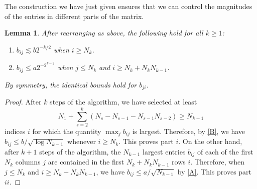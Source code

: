 \documentclass[10pt,reqno]{amsart}
\newtheorem{lem}[thm]{Lemma}
\theoremstyle{definition}
\numberwithin{equation}{section}
\numberwithin{figure}{section}
\numberwithin{table}{section}
\begin{document}
The construction we have just given ensures that we can control the 
magnitudes of the entries in different parts of the matrix.

\begin{lem}
\label{lem:core}
After rearranging as above, the following hold for all $k\ge 1$:
\begin{enumerate}[leftmargin=*,label=\roman*.]
\item $b_{ij}\lesssim b2^{-k/2}$ when $i\ge N_k$.
\item $b_{ij}\le a2^{-2^{k-2}}$ when $j\le N_k$ and
$i\ge N_k+N_kN_{k-1}$.
\end{enumerate}
By symmetry, the identical bounds hold for $b_{ji}$.
\end{lem}

\begin{proof}
After $k$ steps of the algorithm, we have selected at least
$$
	N_1 + \sum_{s=2}^k (N_s-N_{s-1}-N_{s-1}N_{s-2}) \ge
	N_{k-1}
$$
indices $i$ for which the quantity $\max_j b_{ij}$ is largest. Therefore,
by \eqref{B}, we have $b_{ij}\le b/\!\sqrt{\log N_{k-1}}$ whenever
$i\ge N_k$. This proves part $i$.
On the other hand, after $k+1$ steps of the algorithm, the $N_{k-1}$ 
largest entries $b_{ij}$ of each of the first $N_k$ columns $j$ are 
contained in the first $N_k+N_kN_{k-1}$ rows $i$. Therefore, when
$j\le N_k$ and $i\ge N_k+N_kN_{k-1}$, we have $b_{ij}\le 
a/\!\sqrt{N_{k-1}}$ by \eqref{A}. This proves part $ii$.
\end{proof}
\end{document}
